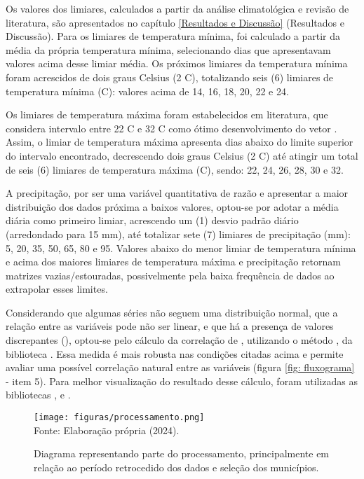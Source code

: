 \indent Os valores dos limiares, calculados a partir da análise climatológica e revisão de literatura, são apresentados no capítulo \ref{Resultados e Discussão} (Resultados e Discussão). Para os limiares de temperatura mínima, foi calculado a partir da média da própria temperatura mínima, selecionando dias que apresentavam valores acima desse limiar média. Os próximos limiares da temperatura mínima foram acrescidos de dois graus Celsius (2 C), totalizando seis (6) limiares de temperatura mínima (C): valores acima de 14, 16, 18, 20, 22 e 24.

\indent Os limiares de temperatura máxima foram estabelecidos em literatura, que considera intervalo entre 22 C e 32 C como ótimo desenvolvimento do vetor \cite{AedesTemp}. Assim, o limiar de temperatura máxima apresenta dias abaixo do limite superior do intervalo encontrado, decrescendo dois graus Celsius (2 C) até atingir um total de seis (6) limiares de temperatura máxima (C), sendo: 22, 24, 26, 28, 30 e 32.

\indent A precipitação, por ser uma variável quantitativa de razão e apresentar a maior distribuição dos dados próxima a baixos valores, optou-se por adotar a média diária como primeiro limiar, acrescendo um (1) desvio padrão diário (arredondado para 15 mm), até totalizar sete (7) limiares de precipitação (mm): 5, 20, 35, 50, 65, 80 e 95.
Valores abaixo do menor limiar de temperatura mínima e acima dos maiores limiares de temperatura máxima e precipitação retornam matrizes vazias/estouradas, possivelmente pela baixa frequência de dados ao extrapolar esses limites.

\indent Considerando que algumas séries não seguem uma distribuição normal, que a relação entre as variáveis pode não ser linear, e que há a presença de valores discrepantes (), optou-se pelo cálculo da correlação de , utilizando o método  , da biblioteca . Essa medida é mais robusta nas condições citadas acima e permite avaliar uma possível correlação natural entre as variáveis (figura \ref{fig: fluxograma} - item 5). Para melhor visualização do resultado desse cálculo, foram utilizadas as bibliotecas ,  e .

\begin{figure}[htbp]
    \centering
    \caption{Diagrama representando parte do processamento, principalmente em relação ao período retrocedido dos dados e seleção dos municípios.}
    \texttt{[image: figuras/processamento.png]}
    \label{fig: processamento}
    \\
    \vspace{-0.05cm}\hspace{-7.5cm}\small{Fonte: Elaboração própria (2024).} 
\end{figure}


